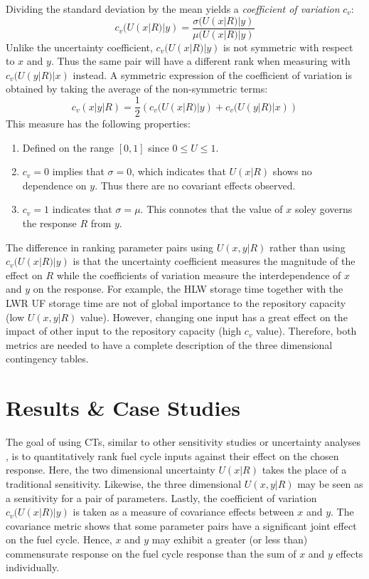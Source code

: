 Dividing the standard deviation by the mean yields a \emph{coefficient of variation} $c_v$:
\begin{equation} c_v(U(x|R)|y) = \frac{\sigma(U(x|R)|y)}{\mu(U(x|R)|y)} \end{equation}
Unlike the uncertainty coefficient, $c_v(U(x|R)|y)$ is not symmetric with respect to $x$ and $y$.  
Thus the same pair will have a different rank when measuring
with $c_v(U(y|R)|x)$ instead.  A symmetric expression of the coefficient of variation is obtained by taking 
the average of the non-symmetric terms:
\begin{equation}
c_v(x|y|R) = \frac{1}{2} \left(c_v(U(x|R)|y) + c_v(U(y|R)|x)\right)
\end{equation}
This measure has the following properties:
\begin{enumerate}
    \item Defined on the range $[0, 1]$ since $0 \le U \le 1$.
    \item $c_v = 0$ implies that $\sigma = 0$, which indicates that $U(x|R)$
        shows no dependence on $y$.  Thus there are no covariant effects observed.
    \item $c_v = 1$ indicates that $\sigma = \mu$.  This connotes
        that the value of $x$ soley governs the response $R$ from $y$.
\end{enumerate}

The difference in ranking parameter pairs using $U(x,y|R)$ rather than using $c_v(U(x|R)|y)$ is that 
the uncertainty coefficient measures the magnitude of the effect on $R$ while the coefficients of 
variation measure the 
interdependence of $x$ and $y$ on the response. For example, the HLW storage time together with the LWR UF 
storage time are not of global importance to the repository capacity (low $U(x,y|R)$ value).
However, changing one input has a great effect on the impact of other input to the repository capacity 
(high $c_v$ value). Therefore, both metrics are needed to have a complete description of the three 
dimensional contingency tables.



\section{Results \& Case Studies}
\label{cts_sec:results}

The goal of using CTs, similar to other sensitivity studies \cite{Scopatz2010b} or uncertainty 
analyses \cite{Barratt2004}, is to quantitatively rank fuel cycle inputs against their effect on 
the chosen response.  Here, the two dimensional uncertainty $U(x|R)$ takes the place of a 
traditional sensitivity.  Likewise, the three dimensional $U(x,y|R)$ may be seen as a sensitivity 
for a pair of parameters.  Lastly, the coefficient of variation $c_v(U(x|R)|y)$ is taken as a 
measure of covariance effects between $x$ and $y$.  The covariance metric shows that some parameter 
pairs have a significant joint effect on the fuel cycle. Hence, $x$ and $y$ may exhibit a greater 
(or less than) commensurate response on the fuel cycle response than the sum of $x$ and $y$ 
effects individually.


